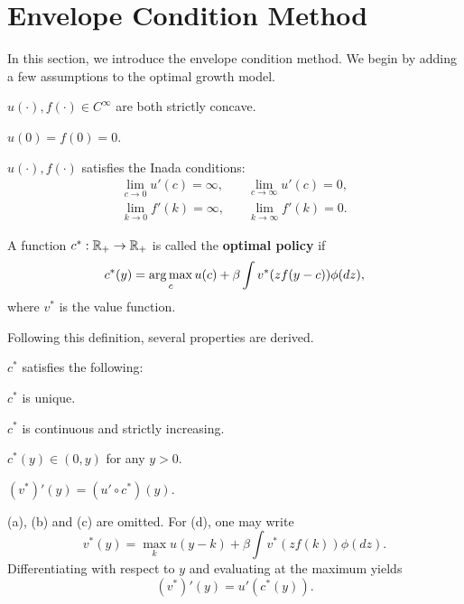 \documentclass[12pt]{article}
\begin{document}
\section{Envelope Condition Method}
In this section, we introduce the envelope condition method. We 
begin by adding a few assumptions to the optimal growth model.

\begin{assumption}
    $u(\cdot), f(\cdot)\in C^\infty$ are both strictly concave.
\end{assumption}

\begin{assumption}
    $u(0) = f(0) = 0$.
\end{assumption}

\begin{assumption}
    $u(\cdot),f(\cdot)$ satisfies the Inada conditions: 
    \begin{equation}
        \begin{aligned}
            \lim_{c\to 0} u'(c) = \infty, \quad & \lim_{c\to \infty} u'(c) = 0,\\
            \lim_{k\to 0} f'(k) = \infty, \quad & \lim_{k\to \infty} f'(k) = 0.
        \end{aligned}
    \end{equation}
\end{assumption}

\begin{definition}
    A function $c^*: \mathbb{R}_+ \to \mathbb{R}_+$ is called the 
    \textbf{optimal policy} if 
    \begin{equation}
        c^*(y) = \operatorname*{arg\,max}_{c} u(c) + \beta\int v^*(zf(y-c))\phi(dz),
    \end{equation}
    where $v^*$ is the value function.
\end{definition}

Following this definition, several properties are derived. 

\begin{proposition}
    $c^*$ satisfies the following:
    \begin{thmenum}
        \item $c^*$ is unique.
        \item $c^*$ is continuous and strictly increasing. 
        \item $c^*(y)\in (0,y)$ for any $y>0$. 
        \item $(v^*)'(y) = (u'\circ c^*)(y)$.
    \end{thmenum}
\end{proposition}
\begin{pf}
    (a), (b) and (c) are omitted. For (d), one may write 
    \begin{equation}
        v^*(y) = \max_k u(y-k) + \beta\int v^*(zf(k))\phi(dz).
    \end{equation}
    Differentiating with respect to $y$ and evaluating at the 
    maximum yields 
    \begin{equation}
        (v^*)'(y) = u'(c^*(y)).
    \end{equation}
\end{pf}
\end{document}
